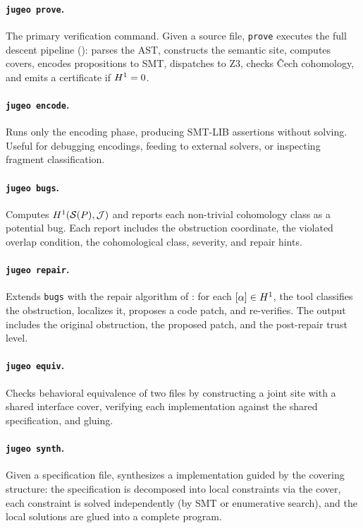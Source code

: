\paragraph{\texttt{jugeo prove}.}
The primary verification command.  Given a \Python{} source file,
\texttt{prove} executes the full descent pipeline
(): parses the AST, constructs the semantic site,
computes covers, encodes propositions to SMT, dispatches to Z3,
checks \v{C}ech cohomology, and emits a certificate if
$H^{1} = 0$.

\paragraph{\texttt{jugeo encode}.}
Runs only the encoding phase, producing SMT-LIB assertions without
solving.  Useful for debugging encodings, feeding to external
solvers, or inspecting fragment classification.

\paragraph{\texttt{jugeo bugs}.}
Computes $H^{1}(\mathcal{S}(P), \mathcal{J})$ and reports each non-trivial
cohomology class as a potential bug.  Each report includes the
obstruction coordinate, the violated overlap condition, the
cohomological class, severity, and repair hints.

\paragraph{\texttt{jugeo repair}.}
Extends \texttt{bugs} with the repair algorithm of
: for each $[\alpha] \in H^{1}$, the tool
classifies the obstruction, localizes it, proposes a code patch,
and re-verifies.  The output includes the original obstruction, the
proposed patch, and the post-repair trust level.

\paragraph{\texttt{jugeo equiv}.}
Checks behavioral equivalence of two \Python{} files by constructing
a joint site with a shared interface cover, verifying each
implementation against the shared specification, and gluing.

\paragraph{\texttt{jugeo synth}.}
Given a specification file, synthesizes a \Python{} implementation
guided by the covering structure: the specification is decomposed
into local constraints via the cover, each constraint is solved
independently (by SMT or enumerative search), and the local
solutions are glued into a complete program.

